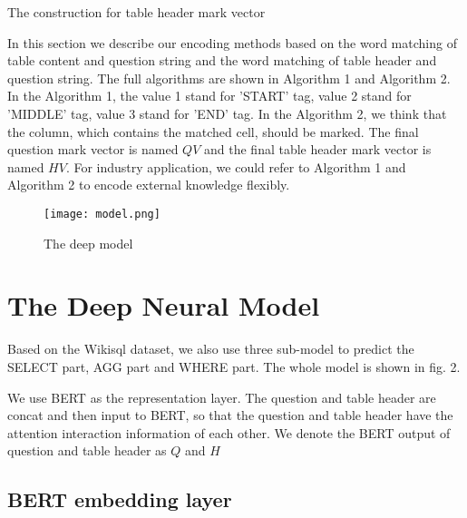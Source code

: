 \documentclass{llncs}
\begin{document}
\begin{algorithm}
\caption{The construction for table header mark vector}
\label{alg:A}
\begin{algorithmic}
\ENDIF
{}
\ENDFOR

\ENDIF
\ENDFOR

\end{algorithmic}
\end{algorithm}


In this section we describe our encoding methods based on the word matching of table content and question string and the word matching of table header and question string. The full algorithms are shown in Algorithm 1 and Algorithm 2. In the Algorithm 1, the value 1 stand for 'START' tag, value 2 stand for 'MIDDLE' tag, value 3 stand for 'END' tag. In the Algorithm 2, we think that the column, which contains the matched cell, should be marked. The final question mark vector is named $QV$ and the final table header mark vector is named $HV$. For industry application, we could refer to Algorithm 1 and Algorithm 2 to encode external knowledge flexibly.



\begin{figure}
\centering
\texttt{[image: model.png]}
\caption{The deep model} \label{fig1}
\end{figure}


\section{The Deep Neural Model}

Based on the Wikisql dataset, we also use three sub-model to predict the SELECT part, AGG part and WHERE part. The whole model is shown in fig. 2.


We use BERT as the representation layer. The question and table header are concat and then input to BERT, so that the question and table header have the attention interaction information of each other.
We denote the BERT output of question and table header as $Q$ and $H$

\subsection{BERT embedding layer}
\end{document}

